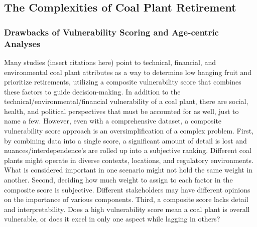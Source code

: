    

    


\subsection{The Complexities of Coal Plant Retirement}

\subsubsection{Drawbacks of Vulnerability Scoring and Age-centric Analyses}

Many studies (insert citations here) point to technical, financial, and environmental 
coal plant attributes as a way to determine low hanging fruit and prioritize retirements, utilizing a composite vulnerability score that combines these factors to guide 
decision-making. In addition to the technical/environmental/financial vulnerability of a coal plant, there are social, health, and political perspectives that must be accounted for as well, just 
to name a few. However, even with a comprehensive dataset, a composite vulnerability score approach is an oversimplification of a complex problem.
First, by combining data into a single score, a significant amount of detail is lost and nuances/interdependence's are rolled up into a subjective 
ranking. Different coal plants might operate in diverse contexts, locations, and regulatory environments. What is considered important in 
one scenario might not hold the same weight in another. Second, deciding how much weight to assign to each factor in the composite score is subjective. Different stakeholders may have 
different opinions on the importance of various components. Third, a composite score lacks detail and interpretability. Does a high vulnerability score mean a coal plant is 
overall vulnerable, or does it excel in only one aspect while lagging in others?


